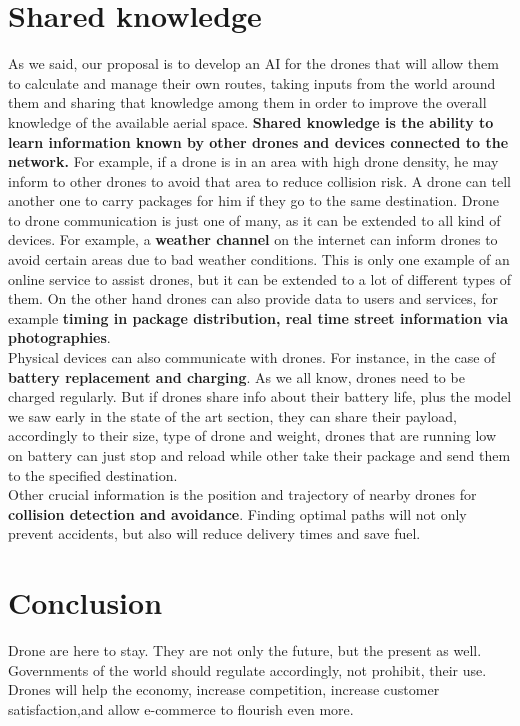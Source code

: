 \documentclass[conference]{IEEEtran}
\begin{document}
\section{Shared knowledge}

As we said, our proposal is to develop an AI for the drones that will allow them to calculate and manage their own routes, taking inputs from the world around them and sharing that knowledge among them in order to improve the overall knowledge of the available aerial space.
\textbf{Shared knowledge is the ability to learn information known by other drones and devices connected to the network.} 
For example, if a drone is in an area with high drone density, he may inform to other drones to avoid that area to reduce collision risk. A drone can tell another one to carry packages for him if they go to the same destination.
Drone to drone communication is just one of many, as it can be extended to all kind of devices. For example, a \textbf{weather channel} on the internet can inform drones to avoid certain areas due to bad weather conditions. This is only one example of an online service to assist drones, but it can be extended to a lot of different types of them. 
On the other hand drones can also provide data to users and services, for example \textbf{timing in package distribution, real time street information via photographies}.\\

Physical devices can also communicate with drones. For instance, in the case of \textbf{battery replacement and charging}. As we all know, drones need to be charged regularly. But if drones share info about their battery life, plus the model we saw early in the state of the art section, they can share their payload, accordingly to their size, type of drone and weight, drones that are running low on battery can just stop and reload while other take their package and send them to the specified destination.\\

Other crucial information is the position and trajectory of nearby drones for \textbf{collision detection and avoidance}. Finding optimal paths will not only prevent accidents, but also will reduce delivery times and save fuel.\\


\section{Conclusion}

Drone are here to stay. They are not only the future, but the present as well. Governments of the world should regulate accordingly, not prohibit, their use.
Drones will help the economy, increase competition, increase customer satisfaction,and allow e-commerce to flourish even more.\\
\end{document}
